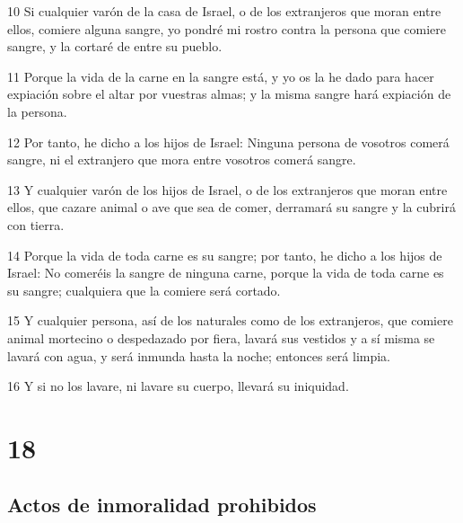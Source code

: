 \par 10 Si cualquier varón de la casa de Israel, o de los extranjeros que moran entre ellos, comiere alguna sangre, yo pondré mi rostro contra la persona que comiere sangre, y la cortaré de entre su pueblo.
\par 11 Porque la vida de la carne en la sangre está, y yo os la he dado para hacer expiación sobre el altar por vuestras almas; y la misma sangre hará expiación de la persona.
\par 12 Por tanto, he dicho a los hijos de Israel: Ninguna persona de vosotros comerá sangre, ni el extranjero que mora entre vosotros comerá sangre.
\par 13 Y cualquier varón de los hijos de Israel, o de los extranjeros que moran entre ellos, que cazare animal o ave que sea de comer, derramará su sangre y la cubrirá con tierra.
\par 14 Porque la vida de toda carne es su sangre; por tanto, he dicho a los hijos de Israel: No comeréis la sangre de ninguna carne, porque la vida de toda carne es su sangre; cualquiera que la comiere será cortado.
\par 15 Y cualquier persona, así de los naturales como de los extranjeros, que comiere animal mortecino o despedazado por fiera, lavará sus vestidos y a sí misma se lavará con agua, y será inmunda hasta la noche; entonces será limpia.
\par 16 Y si no los lavare, ni lavare su cuerpo, llevará su iniquidad.

\chapter{18}

\section*{Actos de inmoralidad prohibidos}

